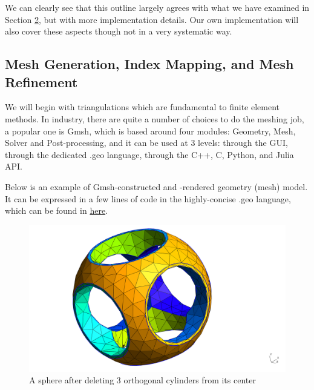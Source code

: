 	We can clearly see that this outline largely agrees with what we have
	examined in Section \hyperref[section.2]{2}, but with more implementation
	details. Our own implementation will also cover these aspects though not
	in a very systematic way.   
	 	
	\subsection{Mesh Generation, Index Mapping, and Mesh Refinement}
	We will begin with triangulations which are fundamental to finite element
	methods. In industry, there are quite a number of choices to do the
	meshing job, a popular one is Gmsh, which is based around four modules:
	Geometry, Mesh, Solver and Post-processing, and it can be used at 3 levels:
	through the GUI, through the dedicated .geo language, through the C++, C,
	Python, and Julia API.\cite{Gmsh}
	
	Below is an example of Gmsh-constructed and -rendered geometry (mesh) 
	model. It can be expressed in a few lines of code in the highly-concise 
	.geo language, which can be found in
	\href{https://gitlab.onelab.info/gmsh/gmsh/blob/master/%
		demos/boolean/boolean.geo}{here}.
	\begin{figure}[!htbp]
		\centering
		\includegraphics[width=0.8\linewidth]{svg/boolean}
		\caption{A sphere after deleting 3 orthogonal cylinders from its center}
	\end{figure}

